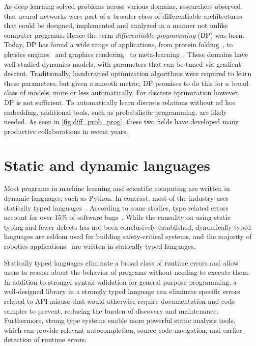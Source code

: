 \documentclass[12pt,initial,twoside,maitrise]{dms}
\numberwithin{equation}{section}
\numberwithin{table}{chapter}
\numberwithin{figure}{chapter}
\begin{document}
As deep learning solved problems across various domains, researchers observed that neural networks were part of a broader class of differentiable architectures that could be designed, implemented and analyzed in a manner not unlike computer programs. Hence the term \textit{differentiable programming} (DP) was born. Today, DP has found a wide range of applications, from protein folding~\citep{alquraishi2018end}, to physics engines~\citep{de2018end,DBLP:journals_corr_DegraveHDW16} and graphics rendering~\citep{loper2014opendr} to meta-learning~\citep{liu2018darts}. These domains have well-studied dynamics models, with parameters that can be tuned via gradient descent. Traditionally, handcrafted optimization algorithms were required to learn these parameters, but given a smooth metric, DP promises to do this for a broad class of models, more or less automatically. For discrete optimization however, DP is not sufficient. To automatically learn discrete relations without ad hoc embedding, additional tools, such as probabilistic programming, are likely needed. As seen in \autoref{fig:diff_prob_prog}, these two fields have developed many productive collaborations in recent years.

\section{Static and dynamic languages}

Most programs in machine learning and scientific computing are written in dynamic languages, such as Python. In contrast, most of the industry uses statically typed languages~\citep{github}. According to some studies, type related errors account for over 15\% of software bugs~\citep{gao2017type}. While the causality on using static typing and fewer defects has not been conclusively established, dynamically typed languages are seldom used for building safety-critical systems, and the majority of robotics applications~\citep{Areserio54:online} are written in statically typed languages.

Statically typed languages eliminate a broad class of runtime errors and allow users to reason about the behavior of programs without needing to execute them. In addition to stronger syntax validation for general purpose programming, a well-designed library in a strongly typed language can eliminate specific errors related to API misuse that would otherwise require documentation and code samples to prevent, reducing the burden of discovery and maintenance. Furthermore, strong type systems enable more powerful static analysis tools, which can provide relevant autocompletion, source code navigation, and earlier detection of runtime errors.
\end{document}
